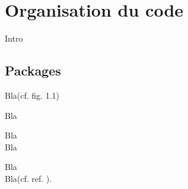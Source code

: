 \chapter{Organisation du code }

Intro\footnotemark\\

\section{Packages}

Bla(cf. fig. 1.1)\\



{}

Bla

Bla\\

Bla




Bla\footnotemark\\

Bla(cf. ref. \cite{cite6}).

